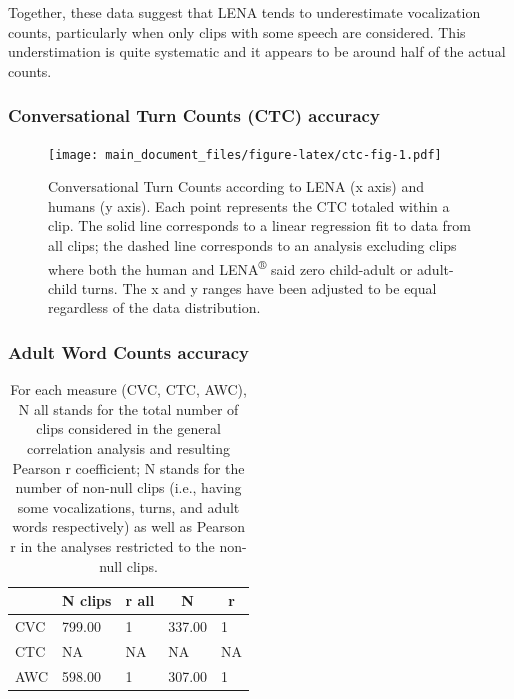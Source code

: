 \documentclass[english,table,man,floatsintext]{apa6}
\begin{document}
Together, these data suggest that LENA tends to underestimate vocalization counts, particularly when only clips with some speech are considered. This understimation is quite systematic and it appears to be around half of the actual counts.

\hypertarget{conversational-turn-counts-ctc-accuracy}{%
\subsubsection{Conversational Turn Counts (CTC) accuracy}\label{conversational-turn-counts-ctc-accuracy}}

\begin{figure}
\centering
\texttt{[image: main\_document\_files/figure-latex/ctc-fig-1.pdf]}
\caption{\label{fig:ctc-fig}Conversational Turn Counts according to LENA (x axis) and humans (y axis). Each point represents the CTC totaled within a clip. The solid line corresponds to a linear regression fit to data from all clips; the dashed line corresponds to an analysis excluding clips where both the human and LENA\textsuperscript{®} said zero child-adult or adult-child turns. The x and y ranges have been adjusted to be equal regardless of the data distribution.}
\end{figure}

\hypertarget{adult-word-counts-accuracy}{%
\subsubsection{Adult Word Counts accuracy}\label{adult-word-counts-accuracy}}

\begin{table}[tbp]

\begin{center}
\begin{threeparttable}

\caption{\label{tab:tabrs}For each measure (CVC, CTC, AWC), N all stands for the total number of clips considered in the general correlation analysis and resulting Pearson r coefficient; N stands for the number of non-null clips (i.e., having some vocalizations, turns, and adult words respectively) as well as Pearson r in the analyses restricted to the non-null clips.}

\begin{tabular}{lllll}
\toprule
 & \multicolumn{1}{c}{N clips} & \multicolumn{1}{c}{r all} & \multicolumn{1}{c}{N} & \multicolumn{1}{c}{r}\\
\midrule
CVC & 799.00 & 1 & 337.00 & 1\\
CTC & NA & NA & NA & NA\\
AWC & 598.00 & 1 & 307.00 & 1\\
\bottomrule
\end{tabular}

\end{threeparttable}
\end{center}

\end{table}
\end{document}
